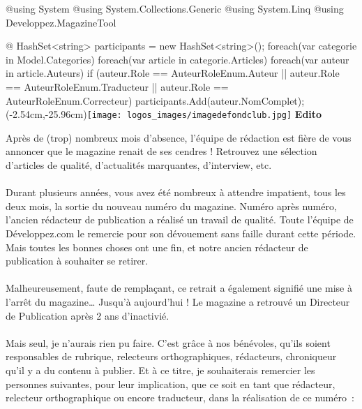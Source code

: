 ﻿@using System
@using System.Collections.Generic
@using System.Linq
@using Developpez.MagazineTool

@{
	HashSet<string> participants = new HashSet<string>();
	foreach(var categorie in Model.Categories)
	{
		foreach(var article in categorie.Articles)
		{
			foreach(var auteur in article.Auteurs)
			{
				if (auteur.Role == AuteurRoleEnum.Auteur ||
					auteur.Role == AuteurRoleEnum.Traducteur ||
					auteur.Role == AuteurRoleEnum.Correcteur)
				{
					participants.Add(auteur.NomComplet);
				}
			}
		}
	}
}
\fancyput(-2.54cm,-25.96cm){\texttt{[image: logos\_images/imagedefondclub.jpg]}}%
{\Huge\sffamily\textbf{\textcolor{bleudvp}{Edito}}}\par\vspace{\baselineskip}
Après de (trop) nombreux mois d’absence, l’équipe de rédaction est fière de vous annoncer que le magazine renait de ses cendres ! Retrouvez une sélection d’articles de qualité, d’actualités marquantes,
d’interview, etc.

\paragraph*{}

Durant plusieurs années, vous avez été nombreux à attendre impatient, tous les deux mois, la sortie du nouveau numéro du magazine. Numéro après numéro, l’ancien rédacteur de publication a
réalisé un travail de qualité. Toute l’équipe de Développez.com le remercie pour son dévouement sans faille durant cette période. Mais toutes les bonnes choses ont une fin, et notre ancien 
rédacteur de publication à souhaiter se retirer. 

\paragraph*{}

Malheureusement, faute de remplaçant, ce retrait a également signifié une mise à l’arrêt du magazine… Jusqu’à aujourd’hui ! Le magazine a retrouvé un Directeur de Publication après 2 ans d'inactivié. 

\paragraph*{}

Mais seul, je n'aurais rien pu faire. C’est grâce à nos bénévoles, qu’ils soient responsables de rubrique, relecteurs orthographiques, rédacteurs, chroniqueur qu’il y a du contenu à publier. 
Et à ce titre, je souhaiterais remercier les personnes suivantes, pour leur implication, que ce soit en tant que rédacteur, relecteur orthographique ou encore traducteur, dans la réalisation de ce numéro~:

